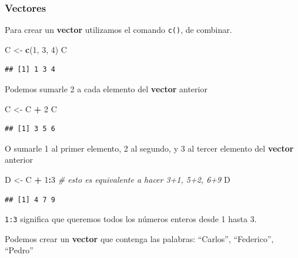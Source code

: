\documentclass[]{book}
\newenvironment{Shaded}{\begin{snugshade}}{\end{snugshade}}
\newcommand{\CommentTok}[1]{\textcolor[rgb]{0.56,0.35,0.01}{\textit{#1}}}
\newcommand{\DecValTok}[1]{\textcolor[rgb]{0.00,0.00,0.81}{#1}}
\newcommand{\KeywordTok}[1]{\textcolor[rgb]{0.13,0.29,0.53}{\textbf{#1}}}
\newcommand{\NormalTok}[1]{#1}
\newcommand{\OperatorTok}[1]{\textcolor[rgb]{0.81,0.36,0.00}{\textbf{#1}}}
\newcommand{\StringTok}[1]{\textcolor[rgb]{0.31,0.60,0.02}{#1}}
\begin{document}
\hypertarget{vectores}{%
\subsubsection{Vectores}\label{vectores}}

Para crear un \textbf{vector} utilizamos el comando \texttt{c()}, de combinar.

\begin{Shaded}
\begin{Highlighting}[]
\NormalTok{C <-}\StringTok{ }\KeywordTok{c}\NormalTok{(}\DecValTok{1}\NormalTok{, }\DecValTok{3}\NormalTok{, }\DecValTok{4}\NormalTok{)}
\NormalTok{C}
\end{Highlighting}
\end{Shaded}

\begin{verbatim}
## [1] 1 3 4
\end{verbatim}

Podemos sumarle 2 a cada elemento del \textbf{vector} anterior

\begin{Shaded}
\begin{Highlighting}[]
\NormalTok{C <-}\StringTok{ }\NormalTok{C }\OperatorTok{+}\StringTok{ }\DecValTok{2}
\NormalTok{C}
\end{Highlighting}
\end{Shaded}

\begin{verbatim}
## [1] 3 5 6
\end{verbatim}

O sumarle 1 al primer elemento, 2 al segundo, y 3 al tercer elemento del \textbf{vector} anterior

\begin{Shaded}
\begin{Highlighting}[]
\NormalTok{D <-}\StringTok{ }\NormalTok{C }\OperatorTok{+}\StringTok{ }\DecValTok{1}\OperatorTok{:}\DecValTok{3} \CommentTok{# esto es equivalente a hacer 3+1, 5+2, 6+9 }
\NormalTok{D}
\end{Highlighting}
\end{Shaded}

\begin{verbatim}
## [1] 4 7 9
\end{verbatim}

\texttt{1:3} significa que queremos todos los números enteros desde 1 hasta 3.

Podemos crear un \textbf{vector} que contenga las palabras: ``Carlos'', ``Federico'', ``Pedro''
\end{document}

